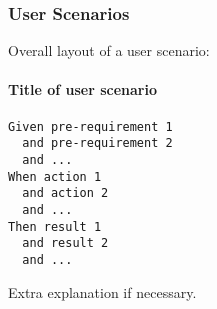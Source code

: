 \subsubsection{User Scenarios}
Overall layout of a user scenario:

\paragraph{Title of user scenario}
\begin{verbatim}
Given pre-requirement 1
  and pre-requirement 2
  and ...
When action 1
  and action 2
  and ...
Then result 1
  and result 2
  and ...
\end{verbatim}

Extra explanation if necessary.
